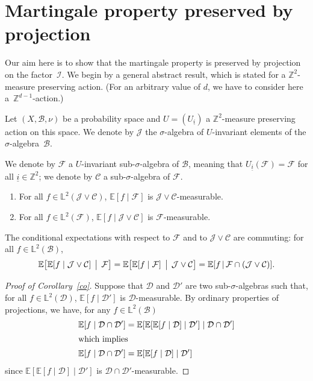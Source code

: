 \documentclass[10pt]{amsart}
\theoremstyle{definition}\newtheorem{defi}[theo]{Definition}\newtheorem{rema}[theo]{Remark}\newtheorem{exam}[theo]{Example}\newtheorem{exem}[theo]{Example}\newtheorem{nota}[theo]{Notation}
\newcommand{\Z}{\mathbb{Z}}
\newcommand*\bbL{\mathbb{L}}
\newcommand{\bbE}{\mathbb{E}}
\newcommand{\E}[1]{\bbE\left[#1\right]}
\newcommand*\I{\mathcal{I}}
\newcommand*\J{\mathcal{J}}
\newcommand*\C{\mathcal{C}}
\newcommand*\B{\mathcal{B}}
\newcommand*\D{\mathcal{D}}
\newcommand*\F{\mathcal{F}}
\let\originalleft\left
\let\originalright\right
\renewcommand{\left}{\mathopen{}\mathclose\bgroup\originalleft}
\renewcommand{\right}{\aftergroup\egroup\originalright}
\newcommand*{\relabel}{\renewcommand{\labelenumi}{(\theenumi)}}
\newcommand*{\romanenumi}{\renewcommand*{\theenumi}{\roman{enumi}}\relabel}
\begin{document}
\section{Martingale property preserved by projection}\label{proj-mart}

Our aim here is to show that the martingale property is preserved by projection on the factor~$\I$. We begin by a general abstract result, which is stated for a $\Z^{2}$-measure preserving action. (For an arbitrary value of $d$, we have to consider here a~$\Z^{d-1}$-action.) 

Let $(X,\B,\nu)$ be a probability space and $U=(U_{\underline{i}})$ a $\Z^2$-measure preserving action on this space. We denote by $\J$ the $\sigma$-algebra of $U$-invariant elements of the $\sigma$-algebra~$\B$.

We denote by $\F$ a $U$-invariant sub-$\sigma$-algebra of $\B$, meaning that $U_{\underline{i}}(\F)=\F$ for all $\underline{i}\in\Z^2$; we denote by $\C$ a sub-$\sigma$-algebra of $\F$.

\begin{prop}\label{pro}
\leavevmode
\begin{enumerate}\romanenumi
\item\label{assertion_EfF_mea}
For all $f\in \bbL^2(\J\vee\C)$, $\bbE[f\mid\F]$ is $\J\vee\C$-measurable.
\item\label{assertion_F_mes_J_vee_C}
For all $f\in \bbL^2(\F)$, $\bbE[f\mid\J\vee\C]$ is $\F$-measurable.
\end{enumerate}
\end{prop}

\begin{coro}\label{co}
The conditional expectations with respect to $\F$ and to $\J\vee\C$ are commuting: for all $f\in \bbL^2(\B)$,
\[
\bbE\bigl[\E{f\mid\J\vee\C}\,\bigm|\,\F\bigr]=\bbE\bigl[\E{f\mid\F}\,\bigm|\,\J\vee\C\bigr]=\E{f\,\middle|\,\F\cap(\J\vee\C)}.
\]
\end{coro}


\begin{proof}[Proof of Corollary~\ref{co}]
Suppose that $\D$ and $\D'$ are two sub-$\sigma$-algebras such that, for all $f\in \bbL^2(\D)$, $\bbE[f\mid\D']$ is $\D$-measurable. By ordinary properties of projections, we have, for any $f\in \bbL^2(\B)$
\begin{align*}
\E{f\mid\D\cap\D'} &=\E{\E{\E{f\mid\D}\mid\D'}\mid\D\cap\D'}
\\
\intertext{which implies}
\E{f\mid\D\cap\D'} &=\E{\E{f\mid\D}\mid\D'}
\end{align*}
since $\bbE[\bbE[f\mid\D]\mid\D']$ is $\D\cap\D'$-measurable.
\end{proof}
\end{document}
